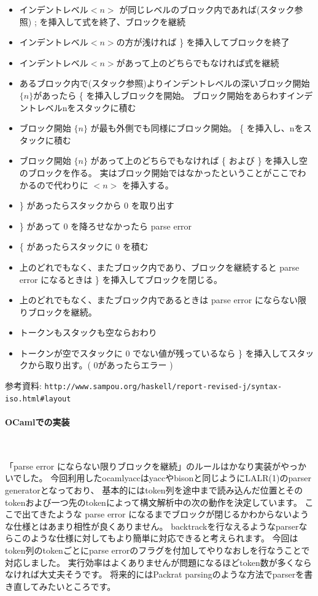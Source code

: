 \documentclass[mingoth,a4paper]{jsarticle}
\begin{document}
\begin{itemize}
 \item インデントレベル$<n>$ が同じレベルのブロック内であれば(スタック参照) ; を挿入して式を終了、ブロックを継続
 \item インデントレベル$<n>$の方が浅ければ \} を挿入してブロックを終了
 \item インデントレベル$<n>$があって上のどちらでもなければ式を継続

 \item あるブロック内で(スタック参照)よりインデントレベルの深いブロック開始$\{n\}$があったら \{ を挿入しブロックを開始。
ブロック開始をあらわすインデントレベルnをスタックに積む
 \item ブロック開始 $\{n\}$ が最も外側でも同様にブロック開始。 \{ を挿入し、nをスタックに積む
 \item ブロック開始 $\{n\}$ があって上のどちらでもなければ \{ および \} を挿入し空のブロックを作る。
実はブロック開始ではなかったということがここでわかるので代わりに $<n>$ を挿入する。

 \item \} があったらスタックから 0 を取り出す
 \item \} があって 0 を降ろせなかったら parse error

 \item \{ があったらスタックに 0 を積む

 \item 上のどれでもなく、またブロック内であり、ブロックを継続すると parse error になるときは \} を挿入してブロックを閉じる。
 \item 上のどれでもなく、またブロック内であるときは parse error にならない限りブロックを継続。
 \item トークンもスタックも空ならおわり
 \item トークンが空でスタックに 0 でない値が残っているなら \} を挿入してスタックから取り出す。( 0があったらエラー )
\end{itemize}

参考資料: \verb|http://www.sampou.org/haskell/report-revised-j/syntax-iso.html#layout|


\paragraph{OCamlでの実装} \ 

「parse error にならない限りブロックを継続」のルールはかなり実装がやっかいでした。%
今回利用したocamlyaccはyaccやbisonと同じようにLALR(1)のparser generatorとなっており、
基本的にはtoken列を途中まで読み込んだ位置とそのtokenおよび一つ先のtokenによって構文解析中の次の動作を決定しています。
ここで出てきたような parse error になるまでブロックが閉じるかわからないような仕様とはあまり相性が良くありません。
backtrackを行なえるようなparserならこのような仕様に対してもより簡単に対応できると考えられます。
今回はtoken列のtokenごとにparse errorのフラグを付加してやりなおしを行なうことで対応しました。
実行効率はよくありませんが問題になるほどtoken数が多くならなければ大丈夫そうです。
将来的にはPackrat parsingのような方法でparserを書き直してみたいところです。
\end{document}
